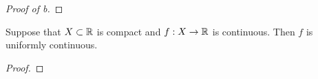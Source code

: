 \documentclass[../main.tex]{subfiles}
\begin{document}
\begin{exercise}
\begin{proof}[Proof of b]
    \end{proof}
\end{exercise}

\begin{theorem}\label{trm:13.6}
    Suppose that $X\subset\mathbb{R}$ is compact and $f:X\to\mathbb{R}$ is continuous. Then $f$ is uniformly continuous.
    \begin{proof}

\end{proof}
\end{theorem}
\end{document}
